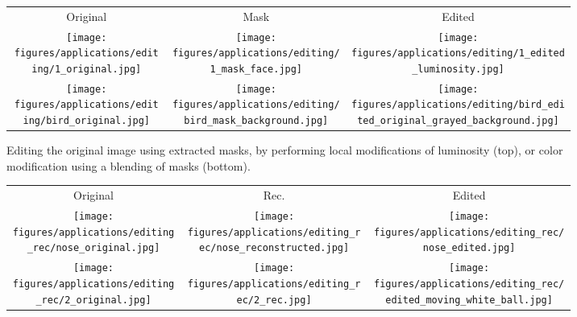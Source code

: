 \documentclass[10pt,twocolumn,letterpaper]{article}
\begin{document}
\setlength{\tabcolsep}{1pt}
\begin{figure*}[ht]
	\begin{subfigure}[t]{0.32\textwidth}
		\begin{tabular}{ccc}
	        Original & Mask & Edited \\
            \texttt{[image: figures/applications/editing/1\_original.jpg]}&
            \texttt{[image: figures/applications/editing/1\_mask\_face.jpg]}&
            \texttt{[image: figures/applications/editing/1\_edited\_luminosity.jpg]}\\
            \texttt{[image: figures/applications/editing/bird\_original.jpg]}&
            \texttt{[image: figures/applications/editing/bird\_mask\_background.jpg]}&
            \texttt{[image: figures/applications/editing/bird\_edited\_original\_grayed\_background.jpg]}
		\end{tabular}
		\caption{Editing the original image using extracted masks, by performing local modifications of luminosity (top), or color modification using a blending of masks (bottom).}
		\label{fig:grouped_applications:a}
	\end{subfigure}
	\hfill
	\begin{subfigure}[t]{0.32\textwidth}
	
		\begin{tabular}{ccc}
		    Original & Rec. & Edited \\
            \texttt{[image: figures/applications/editing\_rec/nose\_original.jpg]}&
            \texttt{[image: figures/applications/editing\_rec/nose\_reconstructed.jpg]}&
            \texttt{[image: figures/applications/editing\_rec/nose\_edited.jpg]}\\
            \texttt{[image: figures/applications/editing\_rec/2\_original.jpg]} & %
            \texttt{[image: figures/applications/editing\_rec/2\_rec.jpg]}&
            \texttt{[image: figures/applications/editing\_rec/edited\_moving\_white\_ball.jpg]}
          

\end{tabular}
\end{subfigure}
\end{figure*}
\end{document}
